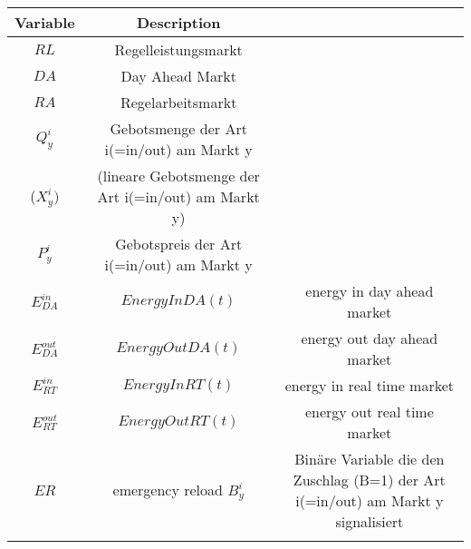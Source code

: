 \begin{tabular}{c|c|c}
	Variable       & Description                                                                                                      \\
	\hline
	$RL$           & Regelleistungsmarkt                                                                                              \\
	$DA$           & Day Ahead Markt                                                                                                  \\
	$RA$           & Regelarbeitsmarkt                                                                                                \\
	$Q^i_{y}$      & Gebotsmenge der Art i(=in/out) am Markt y                                                                        \\
	($X^i_{y})$    & (lineare Gebotsmenge der Art i(=in/out) am Markt y)                                                              \\
	$P^i_{y}$      & Gebotspreis der Art i(=in/out) am Markt y                                                                        \\
	$E^{in}_{DA}$  & $EnergyInDA(t)$                                                                   & energy in day ahead market   \\
	$E^{out}_{DA}$ & $EnergyOutDA(t)$                                                                  & energy out day ahead market  \\
	$E^{in}_{RT}$  & $EnergyInRT(t)$                                                                   & energy in real time market   \\
	$E^{out}_{RT}$ & $EnergyOutRT(t)$                                                                  & energy out  real time market \\
	$ER$           & emergency reload
	$B^i_y$        & Binäre Variable die den Zuschlag (B=1) der Art i(=in/out) am Markt y signalisiert                                \\
	\label{tab:my_label}                                                                                                              \\
\end{tabular}
\\

